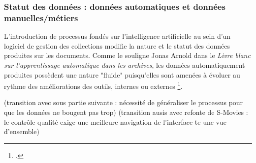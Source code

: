 
\subsubsection{Statut des données : données automatiques et données manuelles/métiers}

L'introduction de processus fondés sur l'intelligence artificielle au sein d'un logiciel de gestion des collections modifie la nature et le statut des données produites sur les documents. Comme le souligne Jonas Arnold dans le \textit{Livre blanc sur l'apprentissage automatique dans les archives}, les données automatiquement produites possèdent une nature "fluide" puisqu'elles sont amenées à évoluer au rythme des améliorations des outils, internes ou externes \footcite{zotero-item-584}. 

(transition avec sous partie suivante : nécessité de généraliser le processus pour que les données ne bougent pas trop) (transition ausis avec refonte de S-Movies : le contrôle qualité exige une meilleure navigation de l'interface te une vue d'ensemble)

